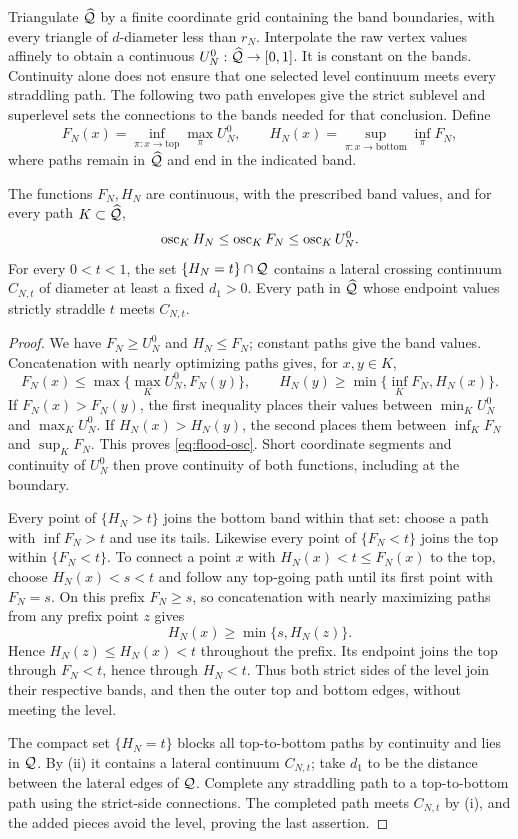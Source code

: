 Triangulate $\widehat{\mathcal Q}$ by a finite coordinate grid containing the band
boundaries, with every triangle of $d$-diameter less than $r_N$.
Interpolate the raw vertex values affinely to obtain a continuous
$U_N^0:\widehat{\mathcal Q}\to[0,1]$. It is constant on the bands. Continuity alone
does not ensure that one selected level continuum meets every
straddling path. The following two path envelopes give the strict
sublevel and superlevel sets the connections to the bands needed for
that conclusion. Define
\[
 F_N(x)=\inf_{\pi:x\to\mathrm{top}}\max_\pi U_N^0,
 \qquad
 H_N(x)=\sup_{\pi:x\to\mathrm{bottom}}\inf_\pi F_N,
\]
where paths remain in $\widehat{\mathcal Q}$ and end in the indicated band.

\begin{lemma}
\label{lem:level-continua}
The functions $F_N,H_N$ are continuous, with the prescribed band values,
and for every path $K\subset\widehat{\mathcal Q}$,
\begin{equation}
 \operatorname{osc}_K H_N\leq\operatorname{osc}_K F_N\leq\operatorname{osc}_K U_N^0.
 \label{eq:flood-osc}
\end{equation}
For every $0<t<1$, the set $\{H_N=t\}\cap\mathcal Q$ contains a lateral
crossing continuum $C_{N,t}$ of diameter at least a fixed $d_1>0$.
Every path in $\widehat{\mathcal Q}$ whose endpoint values strictly straddle $t$
meets $C_{N,t}$.
\end{lemma}
\begin{proof}
We have $F_N\geq U_N^0$ and $H_N\leq F_N$; constant paths give
the band values. Concatenation with nearly optimizing paths gives,
for $x,y\in K$,
\[
 F_N(x)\leq\max\{\max_K U_N^0,F_N(y)\},\qquad
 H_N(y)\geq\min\{\inf_K F_N,H_N(x)\}.
\]
If $F_N(x)>F_N(y)$, the first inequality places their values between
$\min_K U_N^0$ and $\max_K U_N^0$. If $H_N(x)>H_N(y)$, the
second places them between $\inf_K F_N$ and $\sup_K F_N$.
This proves \eqref{eq:flood-osc}. Short coordinate segments and
continuity of $U_N^0$ then prove continuity of both functions,
including at the boundary.

Every point of $\{H_N>t\}$ joins the bottom band within that set:
choose a path with $\inf F_N>t$ and use its tails. Likewise every
point of $\{F_N<t\}$ joins the top within $\{F_N<t\}$.
To connect a point $x$ with $H_N(x)<t\leq F_N(x)$ to the top,
choose $H_N(x)<s<t$ and follow any top-going path until its first
point with $F_N=s$. On this prefix $F_N\geq s$, so concatenation
with nearly maximizing paths from any prefix point $z$ gives
\[
 H_N(x)\geq\min\{s,H_N(z)\}.
\]
Hence $H_N(z)\leq H_N(x)<t$ throughout the prefix. Its endpoint
joins the top through $F_N<t$, hence through $H_N<t$. Thus both
strict sides of the level join their respective bands, and then the
outer top and bottom edges, without meeting the level.

The compact set $\{H_N=t\}$ blocks all top-to-bottom paths by
continuity and lies in $\mathcal Q$. By (ii) it
contains a lateral continuum $C_{N,t}$; take $d_1$ to be the distance
between the lateral edges of $\mathcal Q$. Complete any straddling path to
a top-to-bottom path using the strict-side connections. The completed
path meets $C_{N,t}$ by (i), and the added
pieces avoid the level, proving the last assertion.
\end{proof}

